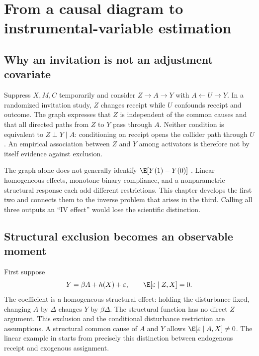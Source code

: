 \chapter{From a causal diagram to instrumental-variable estimation}
\label{r3:instruments}
\section{Why an invitation is not an adjustment covariate}
Suppress $X,M,C$ temporarily and consider
$Z\to A\to Y$ with $A\leftarrow U\to Y$. In a randomized invitation
study, $Z$ changes receipt while $U$ confounds receipt and outcome. The
graph expresses that $Z$ is independent of the common causes and that
all directed paths from $Z$ to $Y$ pass through $A$. Neither condition
is equivalent to $Z\perp Y\mid A$: conditioning on receipt opens the
collider path through $U$. An empirical association between $Z$ and $Y$
among activators is therefore not by itself evidence against exclusion.

The graph alone does not generally identify $\E[Y(1)-Y(0)]$
\citep[Section 3.5]{pearl2009}. Linear homogeneous effects, monotone
binary compliance, and a nonparametric structural response each add
different restrictions. This chapter develops the first two and connects
them to the inverse problem that arises in the third. Calling all three
outputs an ``IV effect'' would lose the scientific distinction.

\section{Structural exclusion becomes an observable moment}
\label{r3:linear-iv}
First suppose
\begin{equation}
 Y=\beta A+h(X)+\varepsilon,
 \qquad \E[\varepsilon\mid Z,X]=0.
 \label{r3:iv-structural}
\end{equation}
The coefficient is a homogeneous structural effect: holding the
disturbance fixed, changing $A$ by $\Delta$ changes $Y$ by $\beta\Delta$.
The structural function has no direct $Z$ argument. This exclusion and
the conditional disturbance restriction are assumptions. A structural
common cause of $A$ and $Y$ allows $\E[\varepsilon\mid A,X]\ne0$.
The linear example in \citet[Section 2]{angrist1996} starts from precisely
this distinction between endogenous receipt and exogenous assignment.

